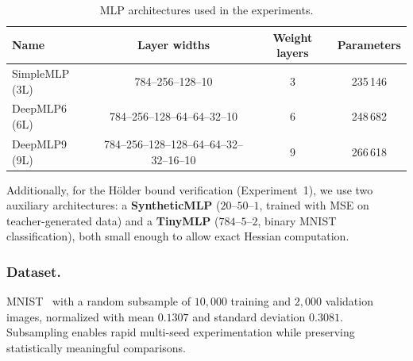 \documentclass[a4paper,fleqn]{cas-sc}
\theoremstyle{remark}
\theoremstyle{definition}
\begin{document}
\begin{table}[ht]
\centering
\caption{MLP architectures used in the experiments.}
\label{tab:architectures}
\begin{tabular}{lccc}
\toprule
\textbf{Name} & \textbf{Layer widths} & \textbf{Weight layers} & \textbf{Parameters} \\
\midrule
SimpleMLP (3L) & 784--256--128--10 & 3 & 235\,146 \\
DeepMLP6 (6L) & 784--256--128--64--64--32--10 & 6 & 248\,682 \\
DeepMLP9 (9L) & 784--256--128--128--64--64--32--32--16--10 & 9 & 266\,618 \\
\bottomrule
\end{tabular}
\end{table}

Additionally, for the Hölder bound verification (Experiment~1), we use two auxiliary architectures: a \textbf{SyntheticMLP} ($20$--$50$--$1$, trained with MSE on teacher-generated data) and a \textbf{TinyMLP} ($784$--$5$--$2$, binary MNIST classification), both small enough to allow exact Hessian computation.

\subsubsection{Dataset.}
MNIST~\cite{lecun1998gradient} with a random subsample of $10{,}000$ training and $2{,}000$ validation images, normalized with mean $0.1307$ and standard deviation $0.3081$. Subsampling enables rapid multi-seed experimentation while preserving statistically meaningful comparisons.
\end{document}
